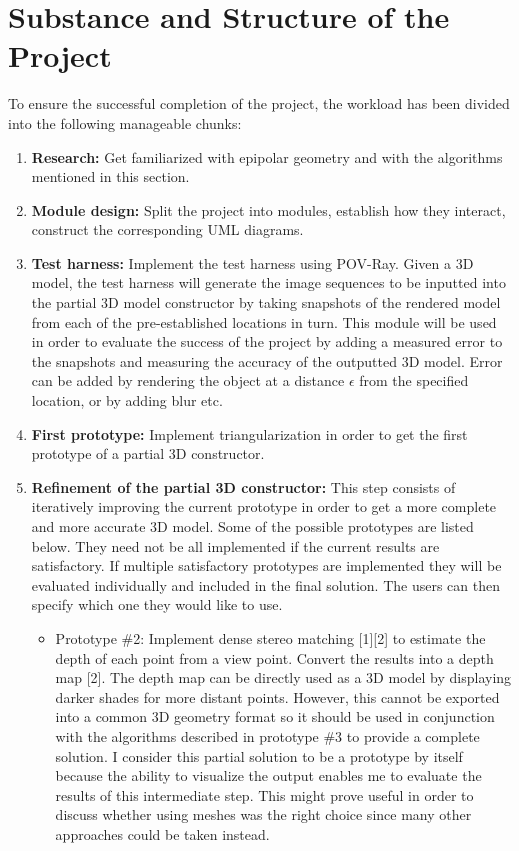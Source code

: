 \section*{Substance and Structure of the Project}
To ensure the successful completion of the project, the workload has been divided into the following manageable chunks:
\begin{enumerate}
\item {\bf Research:} Get familiarized with epipolar geometry and with the algorithms mentioned in this section. 
\item {\bf Module design:} Split the project into modules, establish how they interact, construct the corresponding UML diagrams. 
\item {\bf Test harness:} Implement the test harness using POV-Ray. Given a 3D model, the test harness will generate the image sequences to be inputted into the partial 3D model constructor by taking snapshots of the rendered model from each of the pre-established locations in turn. This module will be used in order to evaluate the success of the project by adding a measured error to the snapshots and measuring the accuracy of the outputted 3D model. Error can be added by rendering the object at a distance $\epsilon$ from the specified location, or by adding blur etc.
\item {\bf First prototype:} Implement triangularization in order to get the first prototype of a partial 3D constructor.
\item {\bf Refinement of the partial 3D constructor:} This step consists of iteratively improving the current prototype in order to get a more complete and more accurate 3D model. Some of the possible prototypes are listed below. They need not be all implemented if the current results are satisfactory. If multiple satisfactory prototypes are implemented they will be evaluated individually and included in the final solution. The users can then specify which one they would like to use. 
	\begin{itemize}
	\item Prototype \#{2}: Implement dense stereo matching [1][2] to estimate the depth of each point from a view point. Convert the results into a depth map [2]. The depth map can be directly used as a 3D model by displaying darker shades for more distant points. However, this cannot be exported into a common 3D geometry format so it should be used in conjunction with the algorithms described in prototype \#{3} to provide a complete solution. I consider this partial solution to be a prototype by itself because the ability to visualize the output enables me to evaluate the results of this intermediate step. This might prove useful in order to discuss whether using meshes was the right choice since many other approaches could be taken instead.

\end{itemize}
\end{enumerate}

